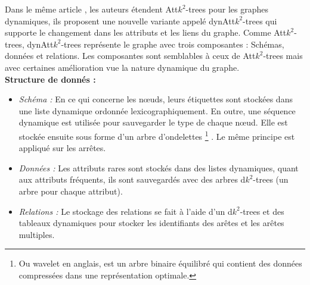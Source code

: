 Dans le même article \citep{alvarez2018compact}, les auteurs étendent Att$k^2$-trees pour les graphes dynamiques, ils proposent une nouvelle variante appelé dynAtt$k^2$-trees qui supporte le changement dans les attributs et les liens du graphe. Comme Att$k^2$-trees, dynAtt$k^2$-trees représente le graphe avec trois composantes : Schémas, données et relations. Les composantes sont semblables à ceux de Att$k^2$-trees mais avec certaines amélioration vue la nature dynamique du graphe.\\
\textbf{Structure de donnés : } 
\begin{itemize}
\item \textit{Schéma :}  En ce qui concerne les nœuds, leurs étiquettes sont stockées dans une liste dynamique ordonnée lexicographiquement. En outre, une séquence dynamique est utilisée pour sauvegarder le type de chaque nœud. Elle est stockée ensuite sous forme d'un arbre d'ondelettes \footnote{Ou wavelet en anglais, est un arbre binaire équilibré qui contient des données compressées dans une représentation optimale.} \citep{grossi2003high}. Le même principe est appliqué sur les arrêtes. 
\item \textit{Données :} Les attributs rares sont stockés dans des listes dynamiques, quant aux attributs fréquents, ils sont sauvegardés avec des arbres d$k^2$-trees (un arbre pour chaque attribut).
\item \textit{Relations :} Le stockage des relations se fait à l'aide d'un d$k^2$-trees et des tableaux dynamiques pour stocker les identifiants des arêtes et les arêtes multiples.
\end{itemize}




























